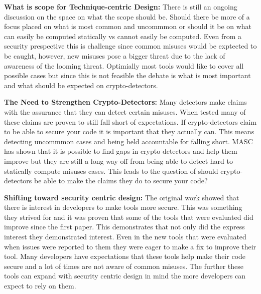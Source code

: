 \textbf{What is scope for Technique-centric Design:}
There is still an ongoing discussion on the space on what the scope should be. Should there be more of a focus placed on what is most common and uncommmon or should it be on what can easily be computed statically vs cannot easily be computed. Even from a security prespective this is challenge since common misuses would be exptected to be caught, however, new misuses pose a bigger threat due to the lack of awareness of the looming threat. Optimially most tools would like to cover all possible cases but since this is not feasible the debate is what is most important and what should be expected on crypto-detectors.

\textbf{The Need to Strengthen Crypto-Detectors:}
Many detectors make claims with the assurance that they can detect certain misuses. When tested many of these claims are proven to still fall short of expectations. If crypto-detectors claim to be able to secure your code it is important that they actually can. This means detecting uncommmon cases and being held accountable for falling short. MASC has shown that it is possible to find gaps in crypto-detectors and help them improve but they are still a long way off from being able to detect hard to statically compute misuses cases. This leads to the question of should crypto-detectors be able to make the claims they do to secure your code?

\textbf{Shifting toward security centric design:}
The original work showed that there is interest in developers to make tools more secure. This was something they strived for and it was proven that some of the tools that were evaluated did improve since the first paper. This demonstrates that not only did the express interest they demonstrated interest. Even in the new tools that were evaluated when issues were reported to them they were eager to make a fix to improve their tool. Many developers have expectations that these tools help make their code secure and a lot of times are not aware of common misuses. The further these tools can expand with security centric design in mind the more developers can expect to rely on them.

